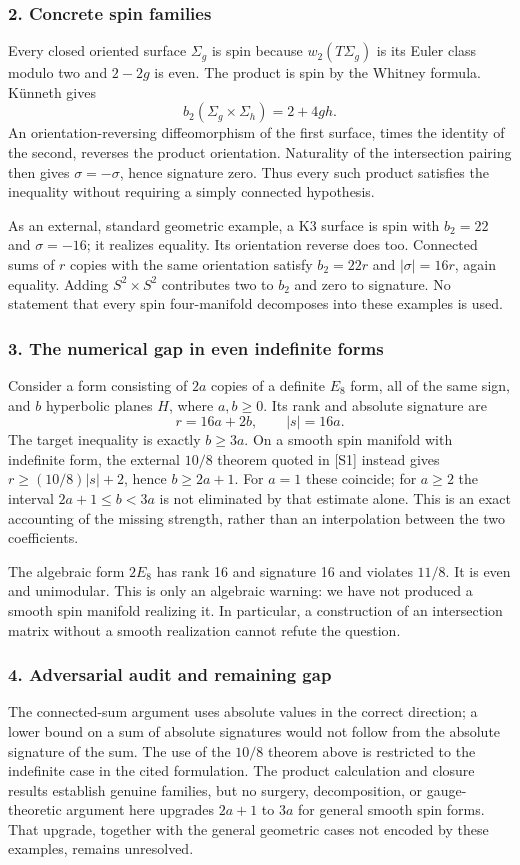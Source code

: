 \documentclass[11pt]{article}
\begin{document}
\subsubsection{2. Concrete spin families}
Every closed oriented surface $\Sigma_g$ is spin because $w_2(T\Sigma_g)$ is its Euler class modulo two and $2-2g$ is even. The product is spin by the Whitney formula. K\"unneth gives
\[b_2(\Sigma_g\times\Sigma_h)=2+4gh.\]
An orientation-reversing diffeomorphism of the first surface, times the identity of the second, reverses the product orientation. Naturality of the intersection pairing then gives $\sigma=-\sigma$, hence signature zero. Thus every such product satisfies the inequality without requiring a simply connected hypothesis.

As an external, standard geometric example, a K3 surface is spin with $b_2=22$ and $\sigma=-16$; it realizes equality. Its orientation reverse does too. Connected sums of $r$ copies with the same orientation satisfy $b_2=22r$ and $|\sigma|=16r$, again equality. Adding $S^2\times S^2$ contributes two to $b_2$ and zero to signature. No statement that every spin four-manifold decomposes into these examples is used.

\subsubsection{3. The numerical gap in even indefinite forms}
Consider a form consisting of $2a$ copies of a definite $E_8$ form, all of the same sign, and $b$ hyperbolic planes $H$, where $a,b\ge0$. Its rank and absolute signature are
\[r=16a+2b,\qquad |s|=16a.\]
The target inequality is exactly $b\ge3a$. On a smooth spin manifold with indefinite form, the external $10/8$ theorem quoted in [S1] instead gives $r\ge(10/8)|s|+2$, hence $b\ge2a+1$. For $a=1$ these coincide; for $a\ge2$ the interval $2a+1\le b<3a$ is not eliminated by that estimate alone. This is an exact accounting of the missing strength, rather than an interpolation between the two coefficients.

The algebraic form $2E_8$ has rank 16 and signature 16 and violates $11/8$. It is even and unimodular. This is only an algebraic warning: we have not produced a smooth spin manifold realizing it. In particular, a construction of an intersection matrix without a smooth realization cannot refute the question.

\subsubsection{4. Adversarial audit and remaining gap}
The connected-sum argument uses absolute values in the correct direction; a lower bound on a sum of absolute signatures would not follow from the absolute signature of the sum. The use of the $10/8$ theorem above is restricted to the indefinite case in the cited formulation. The product calculation and closure results establish genuine families, but no surgery, decomposition, or gauge-theoretic argument here upgrades $2a+1$ to $3a$ for general smooth spin forms. That upgrade, together with the general geometric cases not encoded by these examples, remains unresolved.
\end{document}
